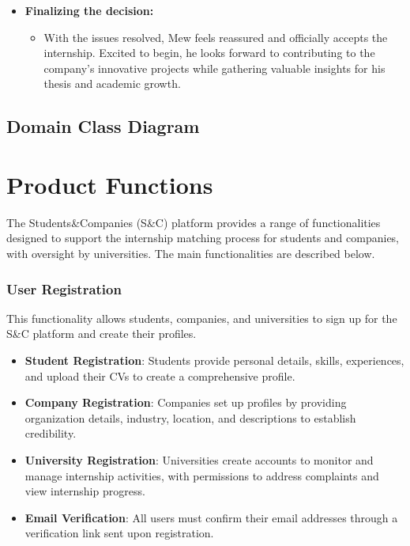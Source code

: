 \begin{itemize}[leftmargin=*, label={}]
    \item \textbf{Finalizing the decision:}
    \begin{itemize}
        \item With the issues resolved, Mew feels reassured and officially accepts the internship. Excited to begin, he looks forward to contributing to the company’s innovative projects while gathering valuable insights for his thesis and academic growth.
    \end{itemize}
\end{itemize}


\subsection{Domain Class Diagram}

\section{Product Functions}

The Students\&Companies (S\&C) platform provides a range of functionalities designed to support the internship matching process for students and companies, with oversight by universities. The main functionalities are described below.

\subsubsection*{User Registration} 
This functionality allows students, companies, and universities to sign up for the S\&C platform and create their profiles.
\begin{itemize}
    \item \textbf{Student Registration}: Students provide personal details, skills, experiences, and upload their CVs to create a comprehensive profile.
    \item \textbf{Company Registration}: Companies set up profiles by providing organization details, industry, location, and descriptions to establish credibility.
    \item \textbf{University Registration}: Universities create accounts to monitor and manage internship activities, with permissions to address complaints and view internship progress.
    \item \textbf{Email Verification}: All users must confirm their email addresses through a verification link sent upon registration.
\end{itemize}

